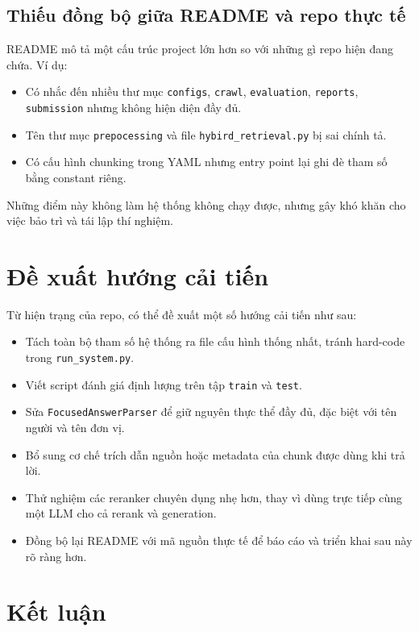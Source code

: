 \documentclass[12pt,a4paper]{article}
\begin{document}
\subsection{Thiếu đồng bộ giữa README và repo thực tế}

README mô tả một cấu trúc project lớn hơn so với những gì repo hiện đang chứa. Ví dụ:
\begin{itemize}[leftmargin=1.5cm]
    \item Có nhắc đến nhiều thư mục \texttt{configs}, \texttt{crawl}, \texttt{evaluation}, \texttt{reports}, \texttt{submission} nhưng không hiện diện đầy đủ.
    \item Tên thư mục \texttt{prepocessing} và file \texttt{hybird\_retrieval.py} bị sai chính tả.
    \item Có cấu hình chunking trong YAML nhưng entry point lại ghi đè tham số bằng constant riêng.
\end{itemize}

Những điểm này không làm hệ thống không chạy được, nhưng gây khó khăn cho việc bảo trì và tái lập thí nghiệm.

\section{Đề xuất hướng cải tiến}

Từ hiện trạng của repo, có thể đề xuất một số hướng cải tiến như sau:
\begin{itemize}[leftmargin=1.5cm]
    \item Tách toàn bộ tham số hệ thống ra file cấu hình thống nhất, tránh hard-code trong \texttt{run\_system.py}.
    \item Viết script đánh giá định lượng trên tập \texttt{train} và \texttt{test}.
    \item Sửa \texttt{FocusedAnswerParser} để giữ nguyên thực thể đầy đủ, đặc biệt với tên người và tên đơn vị.
    \item Bổ sung cơ chế trích dẫn nguồn hoặc metadata của chunk được dùng khi trả lời.
    \item Thử nghiệm các reranker chuyên dụng nhẹ hơn, thay vì dùng trực tiếp cùng một LLM cho cả rerank và generation.
    \item Đồng bộ lại README với mã nguồn thực tế để báo cáo và triển khai sau này rõ ràng hơn.
\end{itemize}

\section{Kết luận}
\end{document}
